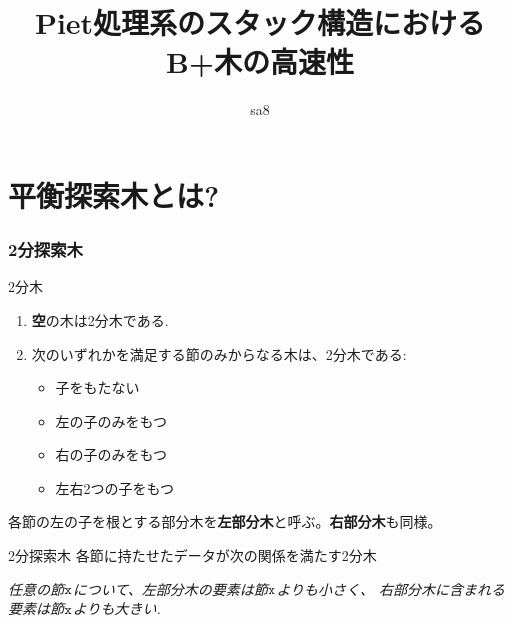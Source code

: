 \documentclass[10pt,draft]{beamer}
\title{Piet処理系のスタック構造における\\B+木の高速性}
\author{sa8}
\begin{document}
\maketitle
\section{平衡探索木とは?}
\begin{frame}
    \frametitle{2分探索木}
    \begin{block}{2分木\cite[\S 6.3]{kondo:1998}}
        \begin{enumerate}
            \item \textbf{空}の木は2分木である.
            \item 次のいずれかを満足する節のみからなる木は、2分木である:
                  \begin{itemize}
                      \item 子をもたない
                      \item 左の子のみをもつ
                      \item 右の子のみをもつ
                      \item 左右2つの子をもつ
                  \end{itemize}
        \end{enumerate}
    \end{block}
    各節の左の子を根とする部分木を{\bf 左部分木}と呼ぶ。{\bf 右部分木}も同様。
    \begin{block}{2分探索木\cite[\S 9]{kondo:1998}}
        各節に持たせたデータが次の関係を満たす2分木

        \textsl{任意の節$\tt x$について、左部分木の要素は節$\tt x$よりも小さく、
            右部分木に含まれる要素は節$\tt x$よりも大きい.}
    \end{block}
\end{frame}
\end{document}
